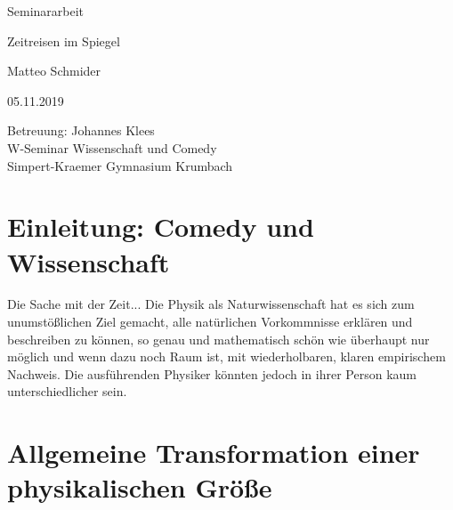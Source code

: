 \documentclass[12pt,a4paper]{scrartcl}
\numberwithin{equation}{section}
\begin{document}
  \pagestyle{empty}

  \begin{titlepage}

    \vspace*{2cm}

 \begin{center} \large

    Seminararbeit
    \vspace*{2cm}

    {\huge Zeitreisen im Spiegel}
    \vspace*{2.5cm}

    Matteo Schmider
    \vspace*{1.5cm}

    05.11.2019
    \vspace*{4.5cm}


    Betreuung: Johannes Klees \\[1cm]
    W-Seminar Wissenschaft und Comedy \\[1cm]
		Simpert-Kraemer Gymnasium Krumbach
  \end{center}
\end{titlepage}



  \tableofcontents

\newpage



  \pagestyle{headings}

  \section{Einleitung: Comedy und Wissenschaft}

Die Sache mit der Zeit... Die Physik als Naturwissenschaft hat es sich zum unumstößlichen Ziel gemacht, alle natürlichen Vorkommnisse erklären und beschreiben zu können, so genau und mathematisch schön wie überhaupt nur möglich und wenn dazu noch Raum ist, mit wiederholbaren, klaren empirischem Nachweis. Die ausführenden Physiker könnten jedoch in ihrer Person kaum unterschiedlicher sein.

  \newpage  %

  \section{Allgemeine Transformation einer physikalischen Größe}
\end{document}
